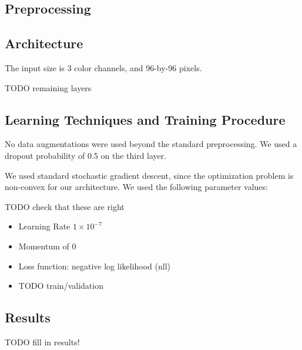\documentclass{article} %
\begin{document}
\subsection{Preprocessing}

\subsection{Architecture}

The input size is 3 color channels, and 96-by-96 pixels. 

TODO remaining layers

\subsection{Learning Techniques and Training Procedure}
No data augmentations were used beyond the standard preprocessing. We used a dropout probability of 0.5 on the third layer.

We used standard stochastic gradient descent, since the optimization problem is
non-convex for our architecture. We used the following parameter values:

TODO check that these are right

\begin{itemize}
\item Learning Rate $1 \times 10^{-7}$
\item Momentum of $0$
\item Loss function: negative log likelihood (nll)
\item TODO train/validation
\end{itemize}

\subsection{Results}

TODO fill in results!




\end{document}
